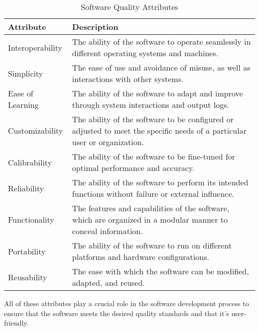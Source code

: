 \begin{table}[H]
\caption{Software Quality Attributes}
\label{tab:software-attributes}
\begin{tabularx}{\textwidth}{lX}
\toprule
\textbf{Attribute} & \textbf{Description} \\
\midrule
Interoperability & The ability of the software to operate seamlessly in different operating systems and machines. \\
Simplicity & The ease of use and avoidance of misuse, as well as interactions with other systems. \\
Ease of Learning & The ability of the software to adapt and improve through system interactions and output logs. \\
Customizability & The ability of the software to be configured or adjusted to meet the specific needs of a particular user or organization. \\
Calibrability & The ability of the software to be fine-tuned for optimal performance and accuracy. \\
Reliability & The ability of the software to perform its intended functions without failure or external influence. \\
Functionality & The features and capabilities of the software, which are organized in a modular manner to conceal information. \\
Portability & The ability of the software to run on different platforms and hardware configurations. \\
Reusability & The ease with which the software can be modified, adapted, and reused. \\
\bottomrule
\end{tabularx}
\end{table}

All of these attributes play a crucial role in the software development process to ensure that the
software meets the desired quality standards and that it's user-friendly.



